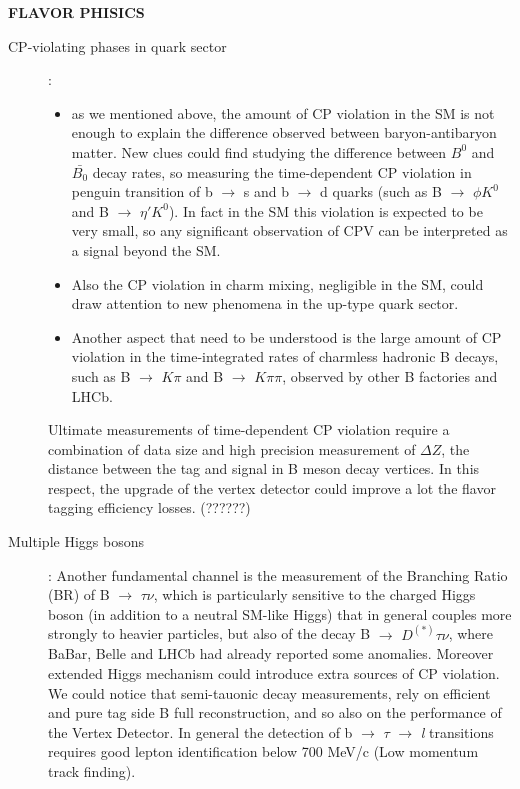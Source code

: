 \textbf{FLAVOR PHISICS}
\begin{description}
\item [CP-violating phases in quark sector]:
	\begin{itemize}
	\item as we mentioned above, the amount of CP violation in the SM is not enough to explain the difference observed between baryon-antibaryon matter. New clues could find studying the difference between $B^{0}$ and $\bar{B_{0}}$ decay rates, so measuring the time-dependent CP violation in penguin transition of  b $\rightarrow$ s and  b $\rightarrow$ d quarks (such as B $\rightarrow$ $\phi K^{0}$ and B $\rightarrow$ $\eta' K^{0}$). In fact in the SM this violation is expected to be very small, so any significant observation of CPV can be interpreted as a signal beyond the SM.
	\item Also the CP violation in charm mixing, negligible in the SM, could draw attention to new phenomena in the up-type quark sector.
	\item Another aspect that need to be understood is the large amount of CP violation in the time-integrated rates of charmless hadronic B decays, such as B $\rightarrow$ $K\pi$ and B $\rightarrow$ $K\pi \pi$, observed by other B factories and LHCb. 
	\end{itemize}

Ultimate measurements of time-dependent CP violation require a combination of data size and high precision measurement of $\Delta Z$, the distance between the tag and signal in B meson decay vertices. In this respect, the upgrade of the vertex detector could improve a lot the flavor tagging efficiency losses. (??????)

\item[Multiple Higgs bosons]: Another fundamental channel is the measurement of the Branching Ratio (BR) of B $\rightarrow$ $\tau\nu$, which is particularly sensitive to the charged Higgs boson (in addition to a neutral SM-like Higgs) that in general couples more strongly to heavier particles, but also of the decay B $\rightarrow$ $D^{(*)}$$\tau\nu$, where BaBar, Belle and LHCb had already reported some anomalies. Moreover extended Higgs mechanism could introduce extra sources of CP violation.
We could notice that semi-tauonic decay measurements, rely on efficient and pure tag side B full reconstruction, and so also on the performance of the Vertex Detector.
In general the detection of b $\rightarrow$ $\tau$ $\rightarrow$ \textit{l} transitions requires good lepton identification below 700 MeV/c (Low momentum track finding).


\end{description}
